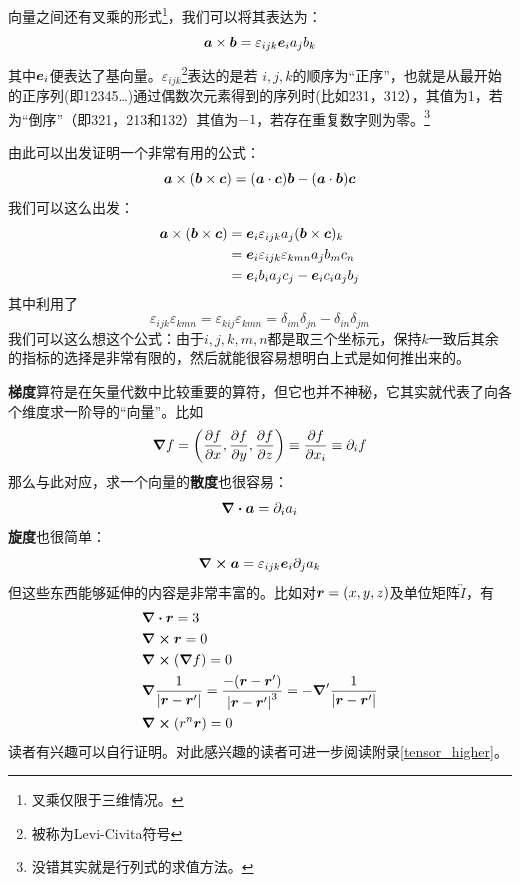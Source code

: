 \documentclass[12pt,a4paper,openany,twoside]{book}
\numberwithin{equation}{section}
\begin{document}
    向量之间还有叉乘的形式\footnote{叉乘仅限于三维情况。}，我们可以将其表达为：
    \begin{equation*}
      \vb*{a} \times \vb*{b} = \varepsilon_{ijk} \vb*{e}_i a_j b_k
    \end{equation*} 
    其中$\vb*{e}_i$便表达了基向量。$\varepsilon_{ijk}$\footnote{被称为Levi-Civita符号}表达的是若 $i,j,k$的顺序为“正序”，也就是从最开始的正序列(即12345\dots)通过偶数次元素得到的序列时(比如231，312），其值为1，若为“倒序”（即321，213和132）其值为$-1$，若存在重复数字则为零。\footnote{没错其实就是行列式的求值方法。}

    由此可以出发证明一个非常有用的公式：
    \begin{equation}
      \vb*{a}\times(\vb*{b}\times\vb*{c})=(\vb*{a}\cdot\vb*{c})\vb*{b}-(\vb*{a}\cdot\vb*{b})\vb*{c}
    \end{equation} 
    我们可以这么出发：
    \begin{align*}
      \vb*{a}\times(\vb*{b}\times\vb*{c})&=\vb*{e}_i\varepsilon_{ijk}a_j(\vb*{b}\times\vb*{c})_k\\
      &=\vb*{e}_i\varepsilon_{ijk}\varepsilon_{kmn}a_jb_mc_n \\
      &=\vb*{e}_ib_ia_jc_j-\vb*{e}_ic_ia_jb_j
    \end{align*}
    其中利用了
    \begin{equation}
      \varepsilon_{ijk}\varepsilon_{kmn}=\varepsilon_{kij}\varepsilon_{kmn}=\delta_{im}\delta_{jn}-\delta_{in}\delta_{jm}
    \end{equation} 
    我们可以这么想这个公式：由于$i,j,k,m,n$都是取三个坐标元，保持$k$一致后其余的指标的选择是非常有限的，然后就能很容易想明白上式是如何推出来的。

    \textbf{梯度}算符是在矢量代数中比较重要的算符，但它也并不神秘，它其实就代表了向各个维度求一阶导的“向量”。比如
    \begin{equation*}
      \grad{f}=\qty(\pdv{f}{x},\pdv{f}{y},\pdv{f}{z})\equiv\pdv{f}{x_i}\equiv\partial_i f
    \end{equation*} 
    那么与此对应，求一个向量的\textbf{散度}也很容易：
    \begin{equation*}
      \div{\vb*{a}}=\partial_i a_i 
    \end{equation*} 
    \textbf{旋度}也很简单：
    \begin{equation*}
      \curl{\vb*{a}}=\varepsilon_{ijk}\vb*{e}_i\partial_j a_k
    \end{equation*} 
    但这些东西能够延伸的内容是非常丰富的。比如对$\vb*{r} = (x,y,z)$及单位矩阵$\overleftrightarrow{I}$，有
    \begin{align}
      &\div{\vb*{r}}=3 \\
      &\curl{\vb*{r}}=0 \\
      &\curl{(\grad{f})}=0 \\
      &\grad{\frac{1}{\abs{\vb*{r}-\vb*{r}'}}}=\frac{-\qty(\vb*{r}-\vb*{r}')}{\abs{\vb*{r}-\vb*{r}'}^3}=-\grad'{\frac{1}{\abs{\vb*{r}-\vb*{r}'}}} \\
      &\curl{\qty(r^n \vb*{r})}=0 
    \end{align}
    读者有兴趣可以自行证明。对此感兴趣的读者可进一步阅读附录\ref{tensor_higher}。\\
\end{document}
